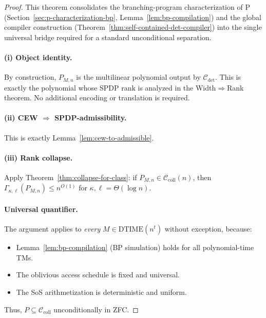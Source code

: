 \documentclass[12pt]{article}
\newcommand{\Comp}{\mathcal{C}}
\theoremstyle{definition}
\theoremstyle{definition}
\theoremstyle{remark}
\theoremstyle{remark}
\begin{document}
\begin{proof}
This theorem consolidates the branching-program characterization of P (Section~\ref{sec:p-characterization-bp}, Lemma~\ref{lem:bp-compilation})
and the global compiler construction (Theorem~\ref{thm:self-contained-det-compiler})
into the single universal bridge required for a standard unconditional separation.

\paragraph{(i) Object identity.}
By construction, $P_{M,n}$ is the multilinear polynomial output by $\Comp_{\mathrm{det}}$.
This is exactly the polynomial whose SPDP rank is analyzed in the Width$\Rightarrow$Rank theorem.
No additional encoding or translation is required.

\paragraph{(ii) CEW $\Rightarrow$ SPDP-admissibility.}
This is exactly Lemma~\ref{lem:cew-to-admissible}.

\paragraph{(iii) Rank collapse.}
Apply Theorem~\ref{thm:collapse-for-class}: if $P_{M,n} \in \mathcal{C}_{\mathrm{coll}}(n)$,
then $\Gamma_{\kappa,\ell}(P_{M,n}) \le n^{O(1)}$ for $\kappa,\ell = \Theta(\log n)$.

\paragraph{Universal quantifier.}
The argument applies to \emph{every} $M \in \mathrm{DTIME}(n^t)$ without exception,
because:
\begin{itemize}
\item Lemma~\ref{lem:bp-compilation} (BP simulation) holds for all polynomial-time TMs.
\item The oblivious access schedule is fixed and universal.
\item The SoS arithmetization is deterministic and uniform.
\end{itemize}

Thus, $P \subseteq \mathcal{C}_{\mathrm{coll}}$ unconditionally in ZFC.
\end{proof}
\end{document}
